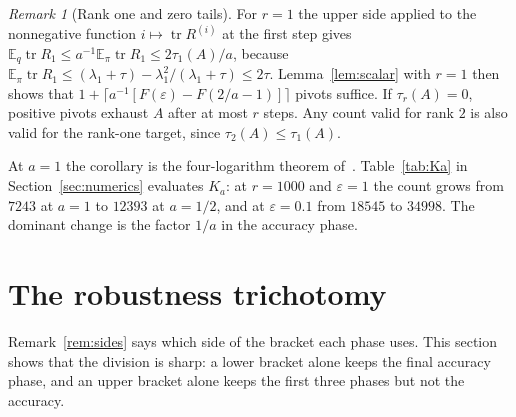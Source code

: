 \documentclass[11pt]{article}
\theoremstyle{definition}\newtheorem{definition}[theorem]{Definition}
\theoremstyle{remark}\newtheorem{remark}[theorem]{Remark}
\newcommand{\E}{\mathbb E}
\newcommand{\eps}{\varepsilon}
\newcommand{\tr}{\operatorname{tr}}
\newcommand{\1}{\mathbf 1}
\begin{document}
\begin{remark}[Rank one and zero tails]\label{rem:rank-one}
For $r=1$ the upper side applied to the nonnegative function
$i\mapsto\tr R^{(i)}$ at the first step gives
$\E_q\tr R_1\le a^{-1}\E_\pi\tr R_1\le2\tau_1(A)/a$, because
$\E_\pi\tr R_1\le(\lambda_1+\tau)-\lambda_1^2/(\lambda_1+\tau)\le2\tau$.
Lemma~\ref{lem:scalar} with $r=1$ then shows that
$1+\lceil a^{-1}[F(\eps)-F(2/a-1)]\rceil$ pivots suffice. If
$\tau_r(A)=0$, positive pivots exhaust $A$ after at most $r$ steps.
Any count valid for rank $2$ is also valid for the rank-one target,
since $\tau_2(A)\le\tau_1(A)$.
\end{remark}

At $a=1$ the corollary is the four-logarithm theorem of~\cite{RA01}.
Table~\ref{tab:Ka} in Section~\ref{sec:numerics} evaluates $K_a$: at
$r=1000$ and $\eps=1$ the count grows from $7243$ at $a=1$ to $12393$ at
$a=1/2$, and at $\eps=0.1$ from $18545$ to $34998$. The dominant change
is the factor $1/a$ in the accuracy phase.
\section{The robustness trichotomy}\label{sec:trichotomy}
Remark~\ref{rem:sides} says which side of the bracket each phase uses.
This section shows that the division is sharp: a lower bracket alone
keeps the final accuracy phase, and an upper bracket alone keeps the
first three phases but not the accuracy.
\end{document}
